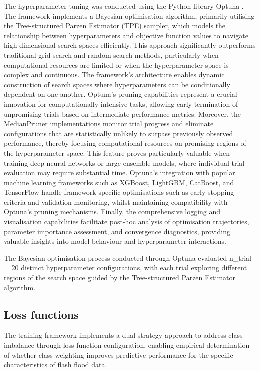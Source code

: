 The  hyperparameter tuning was conducted using the Python library Optuna \citep{Akiba_2019}. The framework implements a Bayesian optimisation algorithm, primarily utilising the Tree-structured Parzen Estimator (TPE) sampler, which models the relationship between hyperparameters and objective function values to navigate high-dimensional search spaces efficiently. This approach significantly outperforms traditional grid search and random search methods, particularly when computational resources are limited or when the hyperparameter space is complex and continuous. The framework's architecture enables dynamic construction of search spaces where hyperparameters can be conditionally dependent on one another. Optuna's pruning capabilities represent a crucial innovation for computationally intensive tasks, allowing early termination of unpromising trials based on intermediate performance metrics. Moreover, the MedianPruner implementations monitor trial progress and eliminate configurations that are statistically unlikely to surpass previously observed performance, thereby focusing computational resources on promising regions of the hyperparameter space. This feature proves particularly valuable when training deep neural networks or large ensemble models, where individual trial evaluation may require substantial time. Optuna's integration with popular machine learning frameworks such as XGBoost, LightGBM, CatBoost, and TensorFlow handle framework-specific optimisations such as early stopping criteria and validation monitoring, whilst maintaining compatibility with Optuna's pruning mechanisms. Finally, the comprehensive logging and visualisation capabilities facilitate post-hoc analysis of optimisation trajectories, parameter importance assessment, and convergence diagnostics, providing valuable insights into model behaviour and hyperparameter interactions.

The Bayesian optimisation process conducted through Optuna evaluated n\_trial = 20 distinct hyperparameter configurations, with each trial exploring different regions of the search space guided by the Tree-structured Parzen Estimator algorithm.


\subsection{Loss functions}

The training framework implements a dual-strategy approach to address class imbalance through loss function configuration, enabling empirical determination of whether class weighting improves predictive performance for the specific characteristics of flash flood data. 


